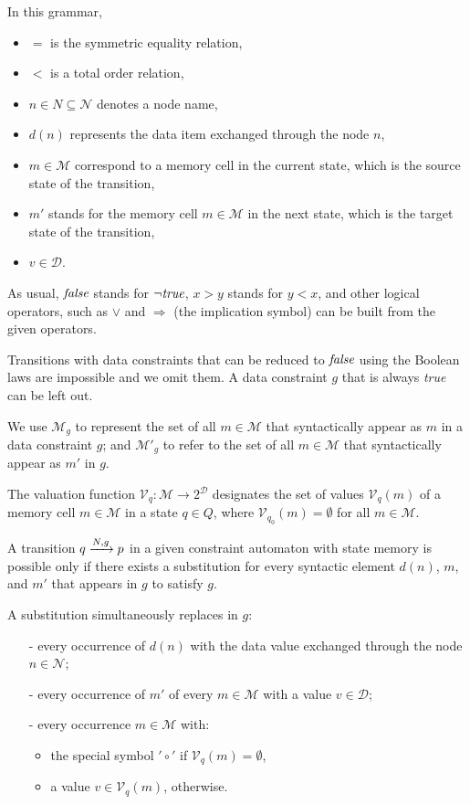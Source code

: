 In this grammar,
\begin{itemize}
\item $=$ is the symmetric equality relation, 
\item $<$ is a total order relation, 
\item $n \in N \subseteq \mathcal{N}$ denotes a node name, 
\item $d(n)$ represents the data item exchanged through the node $n$, 
\item  $m \in \mathcal{M}$ correspond to a memory cell in the current state, which is the source state of the transition, 
\item $m'$ stands for the memory cell $m \in \mathcal{M}$ in the next state, which is the target state of the transition, 
\item $v \in \mathcal{D}$. 
\end{itemize}


As usual, $\emph{false}$ stands for $\neg \emph{true}$, $x > y$ stands for $y < x$, and other logical operators, such as $\vee$ and $\Rightarrow$ (the implication symbol) can be built from the given operators. 


Transitions with data constraints that can be reduced to $\emph{false}$ using the Boolean laws are impossible and we omit them. A data constraint $g$ that is always \emph{true} can be left out.

 We use $\mathcal{M}_g$ to represent the set of all $m \in \mathcal{M}$ that syntactically appear as $m$ in a data constraint $g$; and $\mathcal{M'}_g$ to refer to the set of all $m \in \mathcal{M}$ that syntactically appear as $m'$ in $g$. 
 
 The valuation function $\mathcal{V}_q : \mathcal{M} \rightarrow 2^{\mathcal{D}}$ designates the set of values $\mathcal{V}_q(m)$ of a memory cell $m \in \mathcal{M}$ in a state $q \in Q$, where $\mathcal{V}_{q_0}(m) = \emptyset$ for all $m \in \mathcal{M}$. 

A transition $q\xrightarrow{N,g}p$ in a given constraint automaton with state memory is possible only if there exists a substitution for every syntactic element $d(n)$, $m$, and $m'$ that appears in $g$ to satisfy $g$. 

A substitution simultaneously replaces in $g$:
\begin{itemize}
\item[-] every occurrence of $d(n)$ with the data value exchanged through the node $n \in \mathcal{N}$;
\item[-] every occurrence of $m'$ of every $m \in \mathcal{M}$ with a value $v \in \mathcal{D}$;
\item[-] every occurrence $m \in \mathcal{M}$ with:
\begin{itemize}
 \item the special symbol $'\circ'$ if $\mathcal{V}_q(m) = \emptyset$,
 \item a value $v \in \mathcal{V}_q(m)$, otherwise.
\end{itemize}
\end{itemize}

